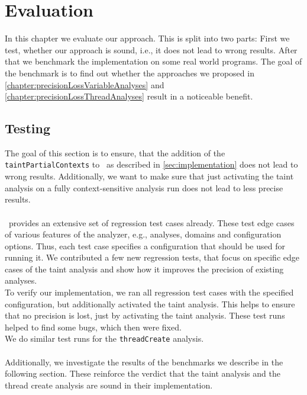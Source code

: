 
\chapter{Evaluation}\label{chapter:evaluation}
  In this chapter we evaluate our approach. This is split into two parts: First we test, whether our approach is sound, i.e., it does not lead to wrong results. After that we benchmark the implementation on some real world programs. The goal of the benchmark is to find out whether the approaches we proposed in \autoref{chapter:precisionLossVariableAnalyses} and \autoref{chapter:precisionLossThreadAnalyses} result in a noticeable benefit.

  \section{Testing}
    The goal of this section is to ensure, that the addition of the \texttt{taintPartialContexts} to \gob\ as described in \autoref{sec:implementation} does not lead to wrong results. Additionally, we want to make sure that just activating the taint analysis on a fully context-sensitive analysis run does not lead to less precise results.\\
    \\
    \gob\ provides an extensive set of regression test cases already. These test edge cases of various features of the analyzer, e.g., analyses, domains and configuration options. Thus, each test case specifies a configuration that should be used for running it. We contributed a few new regression tests, that focus on specific edge cases of the taint analysis and show how it improves the precision of existing analyses.\\
    To verify our implementation, we ran all regression test cases with the specified configuration, but additionally activated the taint analysis. This helps to ensure that no precision is lost, just by activating the taint analysis. These test runs helped to find some bugs, which then were fixed.\\
    We do similar test runs for the \texttt{threadCreate} analysis.\\
    \\
    Additionally, we investigate the results of the benchmarks we describe in the following section. These reinforce the verdict that the taint analysis and the thread create analysis are sound in their implementation.
  
